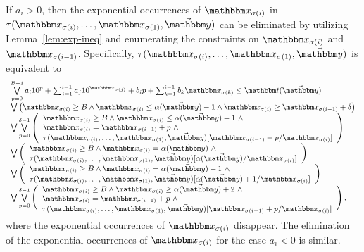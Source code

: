 If $a_i > 0$, then the exponential occurrences of $\ivarx_{\sigma(i)}$ in $\tau(\ivarx_{\sigma(i)}, \ldots, \ivarx_{\sigma(1)}, \vec{\ivary})$ can be eliminated by utilizing  Lemma~\ref{lem:exp-ineq} and enumerating the constraints on $\ivarx_{\sigma(i)}$ and $\ivarx_{\sigma(i-1)}$. Specifically, 
$\tau(\ivarx_{\sigma(i)}, \ldots, \ivarx_{\sigma(1)}, \vec{\ivary})$ is equivalent to 
\vspace{-2mm}
\[
\small
\begin{array}{l}
\bigvee \limits_{p=0}^{B-1} a_i 10^{p}+\sum_{j=1}^{i-1} a_j 10^{\ivarx_{\sigma(j)}} + b_i p + \sum_{k=1}^{i-1}b_k \ivarx_{\sigma(k)} \le \iterm(\vec{\ivary}) \\
\bigvee \big(\ivarx_{\sigma(i)} \ge B \wedge \ivarx_{\sigma(i)} \le \alpha(\vec{\ivary})  -1  \wedge \ivarx_{\sigma(i)} \ge \ivarx_{\sigma(i-1)} +\delta \big)\\
%
\bigvee \bigvee \limits_{p=0}^{\delta-1} 
\left(
\begin{array}{l}
\ivarx_{\sigma(i)} \ge B \wedge \ivarx_{\sigma(i)} \le \alpha(\vec{\ivary})  -1 \ \wedge \\
 \ivarx_{\sigma(i)} = \ivarx_{\sigma(i-1)} +p\ \wedge\\
 \tau(\ivarx_{\sigma(i)}, \ldots, \ivarx_{\sigma(1)}, \vec{\ivary})[\ivarx_{\sigma(i-1)} + p /\ivarx_{\sigma(i)}] 
\end{array}
\right)\\
\bigvee 
\left(
\begin{array}{l}
\ivarx_{\sigma(i)} \ge B \wedge \ivarx_{\sigma(i)} = \alpha(\vec{\ivary})\ \wedge \\
\tau(\ivarx_{\sigma(i)}, \ldots, \ivarx_{\sigma(1)}, \vec{\ivary})[\alpha(\vec{\ivary})/\ivarx_{\sigma(i)}]
\end{array}
\right)  \\
\bigvee 
\left(
\begin{array}{l}
\ivarx_{\sigma(i)} \ge B \wedge \ivarx_{\sigma(i)} = \alpha(\vec{\ivary})+1\ \wedge \\
\tau(\ivarx_{\sigma(i)}, \ldots, \ivarx_{\sigma(1)}, \vec{\ivary})[\alpha(\vec{\ivary})+1/\ivarx_{\sigma(i)}]
\end{array}
\right)  \\
\bigvee \bigvee \limits_{p=0}^{\delta-1} 
\left(
\begin{array}{l}
\ivarx_{\sigma(i)} \ge B \wedge \ivarx_{\sigma(i)} \ge \alpha(\vec{\ivary})+2\ \wedge\\
 \ivarx_{\sigma(i)} = \ivarx_{\sigma(i-1)} +p\ \wedge \\
 \vspace{-1mm}
 \tau(\ivarx_{\sigma(i)}, \ldots, \ivarx_{\sigma(1)}, \vec{\ivary})[\ivarx_{\sigma(i-1)}+ p /\ivarx_{\sigma(i)}]
\end{array}
\right),
\end{array}
\]
where the exponential occurrences of $\ivarx_{\sigma(i)}$ disappear.  
%
The elimination of the exponential occurrences of $\ivarx_{\sigma(i)}$ for the case $a_i < 0$ is similar. 


